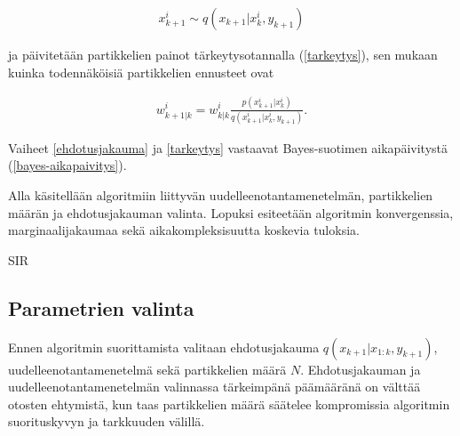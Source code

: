 \documentclass[
  12pt,
  a4paper, twoside]{book}
\begin{document}
\begin{align}\label{ehdotusjakauma}
x_{k+1}^i\sim q(x_{k+1}|x_k^i,y_{k+1})
\end{align}

\noindent ja päivitetään partikkelien painot tärkeytysotannalla (\ref{tarkeytys}), sen mukaan kuinka todennäköisiä partikkelien ennusteet ovat

\begin{align}\label{tarkeytys} w_{k+1|k}^i=w_{k|k}^i\frac{p(x_{k+1}^i|x_k^i)}{q(x_{k+1}^i|x_k^i,y_{k+1})}.
\end{align}

\noindent Vaiheet \ref{ehdotusjakauma} ja \ref{tarkeytys} vastaavat Bayes-suotimen aikapäivitystä (\ref{bayes-aikapaivitys}).

Alla käsitellään algoritmiin liittyvän uudelleenotantamenetelmän, partikkelien määrän ja ehdotusjakauman valinta. Lopuksi esiteetään algoritmin konvergenssia, marginaalijakaumaa sekä aikakompleksisuutta koskevia tuloksia.

\begin{algorithm}[H]
\label{sir}
\DontPrintSemicolon
\SetAlgoShortEnd
{}
\caption{SIR}
\end{algorithm}

\subsection{Parametrien valinta}

Ennen algoritmin suorittamista valitaan ehdotusjakauma \(q(x_{k+1}|x_{1:k},y_{k+1})\), uudelleenotantamenetelmä sekä partikkelien määrä \(N\). Ehdotusjakauman ja uudelleenotantamenetelmän valinnassa tärkeimpänä päämääränä on välttää otosten ehtymistä, kun taas partikkelien määrä säätelee kompromissia algoritmin suorituskyvyn ja tarkkuuden välillä.
\end{document}
